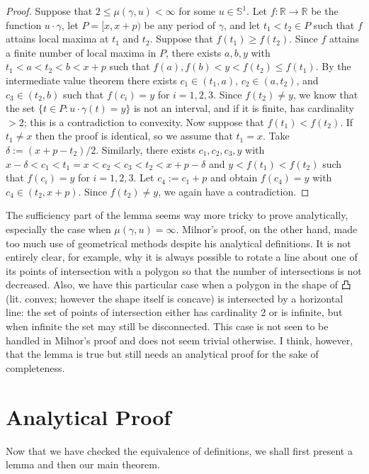 \documentclass{amsart}
\theoremstyle{definition}
\theoremstyle{remark}
\begin{document}
\begin{proof}
    Suppose that $2\le\mu(\gamma,u)<\infty$ for some $u\in\mathbb{S}^1$.
    Let $f:\mathbb{R}\to\mathbb{R}$ be the function $u\cdot\gamma$,
    let $P=[x,x+p)$ be any period of $\gamma$, and let $t_1<t_2\in P$
    such that $f$ attains local maxima at $t_1$ and $t_2$.
    Suppose that $f(t_1)\ge f(t_2)$.
    Since $f$ attains a finite number of local maxima in $P$,
    there exists $a,b,y$ with $t_1<a<t_2<b<x+p$ such that
    $f(a),f(b)<y<f(t_2)\le f(t_1)$.
    By the intermediate value theorem there exists
    $c_1\in(t_1,a)$, $c_2\in(a,t_2)$, and $c_3\in(t_2,b)$ such that
    $f(c_i)=y$ for $i=1,2,3$. Since $f(t_2)\ne y$, we know that
    the set $\{t\in P:u\cdot\gamma(t)=y\}$ is not an interval,
    and if it is finite, has cardinality $>2$; this is a contradiction
    to convexity. Now suppose that $f(t_1)<f(t_2)$.
    If $t_1\ne x$ then the proof is identical,
    so we assume that $t_1=x$. Take $\delta:=(x+p-t_2)/2$.
    Similarly, there exists $c_1,c_2,c_3,y$ with
    $x-\delta<c_1<t_1=x<c_2<c_3<t_2<x+p-\delta$
    and $y<f(t_1)<f(t_2)$ such that
    $f(c_i)=y$ for $i=1,2,3$.
    Let $c_4:=c_1+p$ and obtain $f(c_4)=y$ with $c_4\in(t_2,x+p)$.
    Since $f(t_2)\ne y$, we again have a contradiction.
\end{proof}

The sufficiency part of the lemma seems way more tricky to prove
analytically, especially the case when $\mu(\gamma,u)=\infty$.
Milnor's proof, on the other hand, made too much use of
geometrical methods despite his analytical definitions.
It is not entirely clear, for example, why it is always possible
to rotate a line about one of its points of intersection with
a polygon so that the number of intersections is not decreased.
Also, we have this particular case when a polygon in the shape of 凸
(lit. convex; however the shape itself is concave)
is intersected by a horizontal line: the set of points of intersection
either has cardinality 2 or is infinite, but when infinite
the set may still be disconnected. This case is not seen to
be handled in Milnor's proof and does not seem trivial otherwise.
I think, however, that the lemma is true but still needs
an analytical proof for the sake of completeness.

\section{Analytical Proof}

Now that we have checked the equivalence of definitions,
we shall first present a lemma and then our main theorem.
\end{document}
